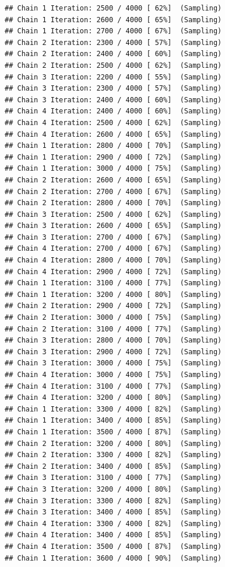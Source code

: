 \documentclass[
]{article}
\begin{document}
\begin{verbatim}
## Chain 1 Iteration: 2500 / 4000 [ 62%]  (Sampling) 
## Chain 1 Iteration: 2600 / 4000 [ 65%]  (Sampling) 
## Chain 1 Iteration: 2700 / 4000 [ 67%]  (Sampling) 
## Chain 2 Iteration: 2300 / 4000 [ 57%]  (Sampling) 
## Chain 2 Iteration: 2400 / 4000 [ 60%]  (Sampling) 
## Chain 2 Iteration: 2500 / 4000 [ 62%]  (Sampling) 
## Chain 3 Iteration: 2200 / 4000 [ 55%]  (Sampling) 
## Chain 3 Iteration: 2300 / 4000 [ 57%]  (Sampling) 
## Chain 3 Iteration: 2400 / 4000 [ 60%]  (Sampling) 
## Chain 4 Iteration: 2400 / 4000 [ 60%]  (Sampling) 
## Chain 4 Iteration: 2500 / 4000 [ 62%]  (Sampling) 
## Chain 4 Iteration: 2600 / 4000 [ 65%]  (Sampling) 
## Chain 1 Iteration: 2800 / 4000 [ 70%]  (Sampling) 
## Chain 1 Iteration: 2900 / 4000 [ 72%]  (Sampling) 
## Chain 1 Iteration: 3000 / 4000 [ 75%]  (Sampling) 
## Chain 2 Iteration: 2600 / 4000 [ 65%]  (Sampling) 
## Chain 2 Iteration: 2700 / 4000 [ 67%]  (Sampling) 
## Chain 2 Iteration: 2800 / 4000 [ 70%]  (Sampling) 
## Chain 3 Iteration: 2500 / 4000 [ 62%]  (Sampling) 
## Chain 3 Iteration: 2600 / 4000 [ 65%]  (Sampling) 
## Chain 3 Iteration: 2700 / 4000 [ 67%]  (Sampling) 
## Chain 4 Iteration: 2700 / 4000 [ 67%]  (Sampling) 
## Chain 4 Iteration: 2800 / 4000 [ 70%]  (Sampling) 
## Chain 4 Iteration: 2900 / 4000 [ 72%]  (Sampling) 
## Chain 1 Iteration: 3100 / 4000 [ 77%]  (Sampling) 
## Chain 1 Iteration: 3200 / 4000 [ 80%]  (Sampling) 
## Chain 2 Iteration: 2900 / 4000 [ 72%]  (Sampling) 
## Chain 2 Iteration: 3000 / 4000 [ 75%]  (Sampling) 
## Chain 2 Iteration: 3100 / 4000 [ 77%]  (Sampling) 
## Chain 3 Iteration: 2800 / 4000 [ 70%]  (Sampling) 
## Chain 3 Iteration: 2900 / 4000 [ 72%]  (Sampling) 
## Chain 3 Iteration: 3000 / 4000 [ 75%]  (Sampling) 
## Chain 4 Iteration: 3000 / 4000 [ 75%]  (Sampling) 
## Chain 4 Iteration: 3100 / 4000 [ 77%]  (Sampling) 
## Chain 4 Iteration: 3200 / 4000 [ 80%]  (Sampling) 
## Chain 1 Iteration: 3300 / 4000 [ 82%]  (Sampling) 
## Chain 1 Iteration: 3400 / 4000 [ 85%]  (Sampling) 
## Chain 1 Iteration: 3500 / 4000 [ 87%]  (Sampling) 
## Chain 2 Iteration: 3200 / 4000 [ 80%]  (Sampling) 
## Chain 2 Iteration: 3300 / 4000 [ 82%]  (Sampling) 
## Chain 2 Iteration: 3400 / 4000 [ 85%]  (Sampling) 
## Chain 3 Iteration: 3100 / 4000 [ 77%]  (Sampling) 
## Chain 3 Iteration: 3200 / 4000 [ 80%]  (Sampling) 
## Chain 3 Iteration: 3300 / 4000 [ 82%]  (Sampling) 
## Chain 3 Iteration: 3400 / 4000 [ 85%]  (Sampling) 
## Chain 4 Iteration: 3300 / 4000 [ 82%]  (Sampling) 
## Chain 4 Iteration: 3400 / 4000 [ 85%]  (Sampling) 
## Chain 4 Iteration: 3500 / 4000 [ 87%]  (Sampling) 
## Chain 1 Iteration: 3600 / 4000 [ 90%]  (Sampling) 

\end{verbatim}
\end{document}
